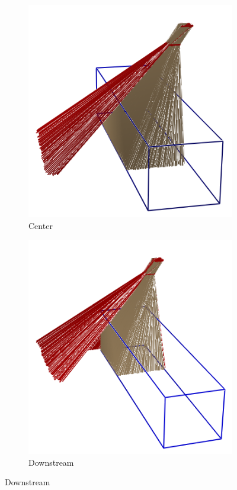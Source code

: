 \documentclass[a4paper,11pt]{article}
\begin{document}
\begin{figure}[htbp]
\begin{subfigure}{0.30\textwidth}
    \includegraphics[width=\linewidth]{figures/center.png}
    \caption{Center} \label{fig:centre}
  \end{subfigure}
  \begin{subfigure}{0.30\textwidth}
    \includegraphics[width=\linewidth]{figures/downstream.png}
    \caption{Downstream} \label{fig:downstream}
  \end{subfigure}


\end{figure}
\end{document}

